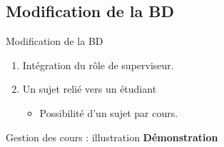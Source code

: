 \documentclass[numbering=fraction]{beamer}
\begin{document}
\subsection{Modification de la BD}
\begin{frame}{Modification de la BD}
    \begin{enumerate}
        \item Intégration du rôle de superviseur.
        \item Un sujet relié vers un étudiant
        \begin{itemize}
            \item Possibilité d'un sujet par cours.
        \end{itemize}
    \end{enumerate}
\end{frame}
\begin{frame}{Gestion des cours : illustration}
    \centering %
\vfill %
\textbf{\Large Démonstration} %
\vfill %
\end{frame}
\end{document}
